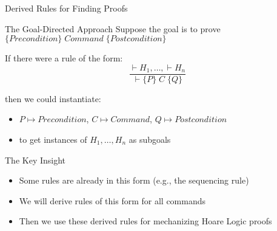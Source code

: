 \begin{frame}{Derived Rules for Finding Proofs}
    \begin{block}{The Goal-Directed Approach}
        Suppose the goal is to prove $\{Precondition\} \; Command \; \{Postcondition\}$
        
        If there were a rule of the form:
        \[ \frac{\vdash H_1, \ldots, \vdash H_n}{\vdash \{P\} \; C \; \{Q\}} \]
        
        then we could instantiate:
        \begin{itemize}
            \item $P \mapsto Precondition$, $C \mapsto Command$, $Q \mapsto Postcondition$
            \item to get instances of $H_1, \ldots, H_n$ as subgoals
        \end{itemize}
    \end{block}
    
    \begin{block}{The Key Insight}
        \begin{itemize}
            \item Some rules are already in this form (e.g., the sequencing rule)
            \item We will derive rules of this form for all commands
            \item Then we use these derived rules for mechanizing Hoare Logic proofs
        \end{itemize}
    \end{block}
\end{frame}

